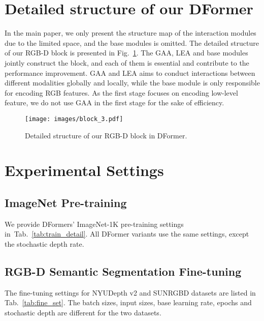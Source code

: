 \documentclass{article}
\newcommand{\figref}[1]{Fig.~\ref{#1}}
\newcommand{\tabref}[1]{Tab.~\ref{#1}}
\newcommand{\nMethod}{DFormer}
\begin{document}
\section{Detailed structure of our \nMethod{}} \label{sec:structure}

In the main paper, we only present the structure map of the interaction modules due to the limited space, and the base modules is omitted.
The detailed structure of our RGB-D block is presented in \figref{fig:detaileds}.
The GAA, LEA and base modules jointly construct the block, and each of them is essential and contribute to the performance improvement.
GAA and LEA aims to conduct interactions between different modalities globally and locally, while the base module is only responsible for encoding RGB features.
As the first stage focuses on encoding low-level feature, we do not use GAA in the first stage for the sake of efficiency.

\begin{figure}[ht]
\centering
\vspace{5pt}
\texttt{[image: images/block\_3.pdf]}
\vspace{-5pt}
\caption{Detailed structure of our RGB-D block in \nMethod{}. 
}\label{fig:detaileds}
\vspace{10pt}
\end{figure}




\section{Experimental Settings}
\label{sec:setting}
\subsection{ImageNet Pre-training} 
\label{subsec:setting}
We provide \nMethod{s}' ImageNet-1K pre-training settings in~\tabref{tab:train_detail}.  All \nMethod{} variants use the same settings, except the stochastic depth rate.


\subsection{RGB-D Semantic Segmentation Fine-tuning}

The fine-tuning settings for NYUDepth v2 and SUNRGBD datasets are listed in \tabref{tab:fine_set}.
The batch sizes, input sizes, base learning rate, epochs and stochastic depth are different for the two datasets.
\end{document}

